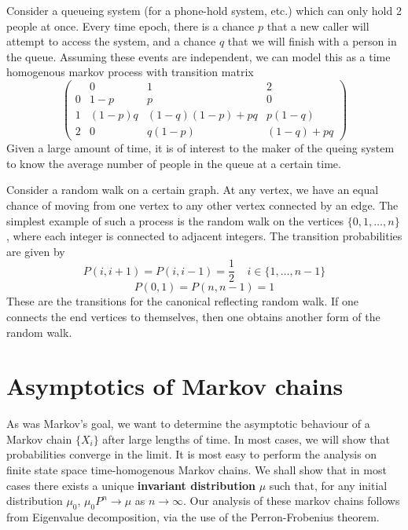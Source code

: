 \begin{example}
    Consider a queueing system (for a phone-hold system, etc.) which can only hold 2 people at once. Every time epoch, there is a chance $p$ that a new caller will attempt to access the system, and a chance $q$ that we will finish with a person in the queue. Assuming these events are independent, we can model this as a time homogenous markov process with transition matrix
    \[ \begin{pmatrix}
    & 0 & 1 & 2 \\
    0 & 1-p & p & 0\\
    1 & (1-p)q & (1 - q)(1 - p) + pq & p(1-q)\\
    2 & 0 & q(1 - p) & (1 - q) + pq \end{pmatrix}
    \]
    Given a large amount of time, it is of interest to the maker of the queing system to know the average number of people in the queue at a certain time.
\end{example}

\begin{example}
    Consider a random walk on a certain graph. At any vertex, we have an equal chance of moving from one vertex to any other vertex connected by an edge. The simplest example of such a process is the random walk on the vertices $\{ 0, 1, \dots, n\}$, where each integer is connected to adjacent integers. The transition probabilities are given by
    \[ P(i,i+1) = P(i,i-1) = \frac{1}{2}\ \ \ \ \ i \in \{1, \dots, n-1 \} \]
    \[ P(0,1) = P(n,n-1) = 1 \]
    These are the transitions for the canonical reflecting random walk. If one connects the end vertices to themselves, then one obtains another form of the random walk.
\end{example}

\section{Asymptotics of Markov chains}

As was Markov's goal, we want to determine the asymptotic behaviour of a Markov chain $\{X_i\}$ after large lengths of time. In most cases, we will show that probabilities converge in the limit. It is most easy to perform the analysis on finite state space time-homogenous Markov chains. We shall show that in most cases there exists a unique {\bf invariant distribution} $\mu$ such that, for any initial distribution $\mu_0$, $\mu_0 P^n \to \mu$ as $n \to \infty$. Our analysis of these markov chains follows from Eigenvalue decomposition, via the use of the Perron-Frobenius theorem.

